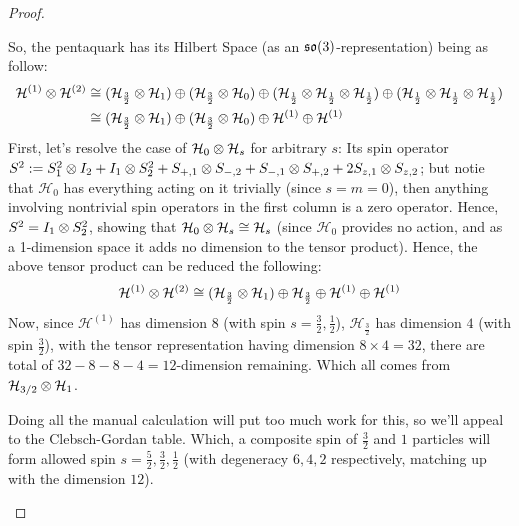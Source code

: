 \documentclass{article}
\begin{document}
\begin{proof}
\begin{itemize}
        So, the pentaquark has its Hilbert Space (as an $\mathfrak{so}(3)$-representation) being as follow:
        \begin{align}
            \mathcal{H}^{(1)}\otimes \mathcal{H}^{(2)} &\cong (\mathcal{H}_{\frac{3}{2}}\otimes \mathcal{H}_{1})\oplus (\mathcal{H}_{\frac{3}{2}}\otimes \mathcal{H}_{0})\oplus (\mathcal{H}_{\frac{1}{2}}\otimes\mathcal{H}_{\frac{1}{2}}\otimes \mathcal{H}_{\frac{1}{2}})\oplus (\mathcal{H}_{\frac{1}{2}}\otimes\mathcal{H}_{\frac{1}{2}}\otimes \mathcal{H}_{\frac{1}{2}})\\
            &\cong (\mathcal{H}_{\frac{3}{2}}\otimes \mathcal{H}_{1})\oplus (\mathcal{H}_{\frac{3}{2}}\otimes \mathcal{H}_{0})\oplus \mathcal{H}^{(1)}\oplus \mathcal{H}^{(1)}
        \end{align}
        First, let's resolve the case of $\mathcal{H}_0 \otimes \mathcal{H}_s$ for arbitrary $s$: Its spin operator $S^2 := S_1^2\otimes I_2+I_1\otimes S_2^2 + S_{+,1}\otimes S_{-,2}+S_{-,1}\otimes S_{+,2}+2S_{z,1}\otimes S_{z,2}$; but notie that $\mathcal{H}_0$ has everything acting on it trivially (since $s=m=0$), then anything involving nontrivial spin operators in the first column is a zero operator. Hence, $S^2 = I_1 \otimes S_2^2$, showing that $\mathcal{H}_0\otimes \mathcal{H}_s \cong \mathcal{H}_s$ (since $\mathcal{H}_0$ provides no action, and as a 1-dimension space it adds no dimension to the tensor product). Hence, the above tensor product can be reduced the following:
        \begin{align}
            \mathcal{H}^{(1)}\otimes \mathcal{H}^{(2)} \cong (\mathcal{H}_{\frac{3}{2}}\otimes \mathcal{H}_{1})\oplus \mathcal{H}_{\frac{3}{2}}\oplus \mathcal{H}^{(1)}\oplus \mathcal{H}^{(1)}
        \end{align}
        Now, since $\mathcal{H}^{(1)}$ has dimension $8$ (with spin $s=\frac{3}{2},\frac{1}{2}$), $\mathcal{H}_{\frac{3}{2}}$ has dimension $4$ (with spin $\frac{3}{2}$), with the tensor representation having dimension $8\times 4 = 32$, there are total of $32-8-8-4=12$-dimension remaining. Which all comes from $\mathcal{H}_{3/2}\otimes \mathcal{H}_1$.

        Doing all the manual calculation will put too much work for this, so we'll appeal to the Clebsch-Gordan table. Which, a composite spin of $\frac{3}{2}$ and $1$ particles will form allowed spin $s = \frac{5}{2},\frac{3}{2},\frac{1}{2}$ (with degeneracy $6,4,2$ respectively, matching up with the dimension $12$).


\end{itemize}
\end{proof}
\end{document}
